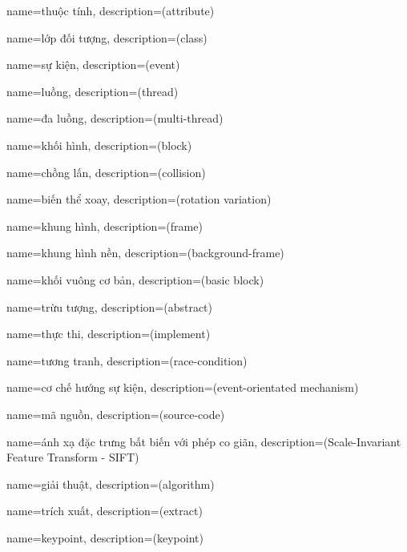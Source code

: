 {
    name={thuộc tính},
    description={(attribute)}
}

{
    name={lớp đối tượng},
    description={(class)}
}

{
    name={sự kiện},
    description={(event)}
}

{
    name={luồng},
    description={(thread)}
}

{
    name={đa luồng},
    description={(multi-thread)}
}

{
    name={khối hình},
    description={(block)}
}

{
    name={chồng lấn},
    description={(collision)}
}

{
    name={biến thể xoay},
    description={(rotation variation)}
}

{
    name={khung hình},
    description={(frame)}
}

{
    name={khung hình nền},
    description={(background-frame)}
}

{
    name={khối vuông cơ bản},
    description={(basic block)}
}

{
    name={trừu tượng},
    description={(abstract)}
}

{
    name={thực thi},
    description={(implement)}
}

{
    name={tương tranh},
    description={(race-condition)}
}

{
    name={cơ chế hướng sự kiện},
    description={(event-orientated mechanism)}
}

{
    name={mã nguồn},
    description={(source-code)}
}

{
    name={ánh xạ đặc trưng bất biến với phép co giãn},
    description={(Scale-Invariant Feature Transform - SIFT)}
}

{
    name={giải thuật},
    description={(algorithm)}
}

{
    name={trích xuất},
    description={(extract)}
}

{
    name={keypoint},
    description={(keypoint)}
}

